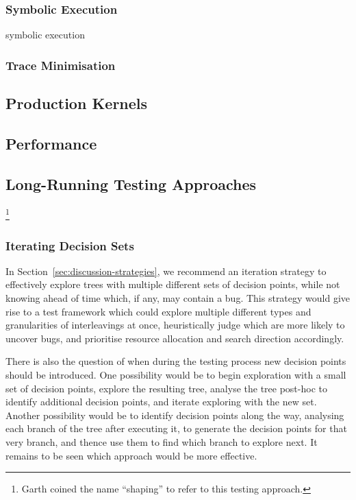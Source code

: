 \subsubsection{Symbolic Execution}
symbolic execution\cite{klee,dawson}

\subsubsection{Trace Minimisation}

\subsection{Production Kernels}
\label{sec:future-linux}


\subsection{Performance}
\label{sec:future-perf}

\subsection{Long-Running Testing Approaches}
\label{sec:future-shaping}
\footnote{Garth coined the name ``shaping'' to refer to this testing approach.}
\subsubsection{Iterating Decision Sets}

In Section~\ref{sec:discussion-strategies}, we recommend an iteration strategy to effectively explore trees with multiple different sets of decision points, while not knowing ahead of time which, if any, may contain a bug.
This strategy would give rise to a test framework which could explore multiple different types and granularities of interleavings at once, heuristically judge which are more likely to uncover bugs, and prioritise resource allocation and search direction accordingly.

There is also the question of when during the testing process new decision points should be introduced.
One possibility would be to begin exploration with a small set of decision points, explore the resulting tree, analyse the tree post-hoc to identify additional decision points, and iterate exploring with the new set.
Another possibility would be to identify decision points along the way, analysing each branch of the tree after executing it, to generate the decision points for that very branch, and thence use them to find which branch to explore next.
It remains to be seen which approach would be more effective.

